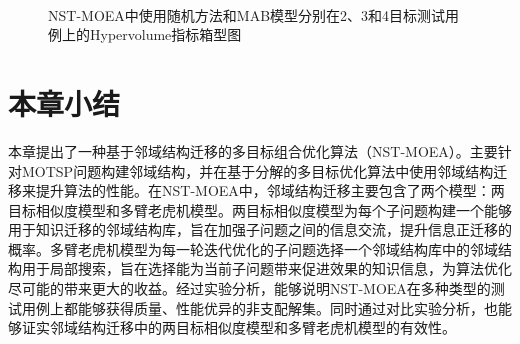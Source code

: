 \begin{figure}[!h]
     \quad
    \\
     \quad
    \caption[NST-MOEA中使用随机方法和MAB模型分别在2、3和4目标测试用例上的Hypervolume指标箱型图]{NST-MOEA中使用随机方法和MAB模型分别在2、3和4目标测试用例上的Hypervolume指标箱型图}
    \label{fig:NST-MOEA中使用随机方法和MAB模型分别在2、3和4目标测试用例上的Hypervolume指标箱型图}
\end{figure}

\section{本章小结}
\label{sec:NST:本章小结}
本章提出了一种基于邻域结构迁移的多目标组合优化算法（NST-MOEA）。主要针对MOTSP问题构建邻域结构，并在基于分解的多目标优化算法中使用邻域结构迁移来提升算法的性能。在NST-MOEA中，邻域结构迁移主要包含了两个模型：两目标相似度模型和多臂老虎机模型。两目标相似度模型为每个子问题构建一个能够用于知识迁移的邻域结构库，旨在加强子问题之间的信息交流，提升信息正迁移的概率。多臂老虎机模型为每一轮迭代优化的子问题选择一个邻域结构库中的邻域结构用于局部搜索，旨在选择能为当前子问题带来促进效果的知识信息，为算法优化尽可能的带来更大的收益。经过实验分析，能够说明NST-MOEA在多种类型的测试用例上都能够获得质量、性能优异的非支配解集。同时通过对比实验分析，也能够证实邻域结构迁移中的两目标相似度模型和多臂老虎机模型的有效性。